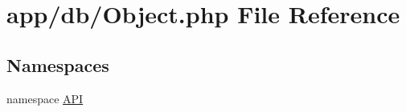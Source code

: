 \hypertarget{Object_8php}{
\section{app/db/Object.php File Reference}
\label{d7/da1/Object_8php}
}
\subsection*{Namespaces}
\begin{DoxyCompactItemize}
\item 
namespace \hyperlink{namespaceAPI}{API}
\end{DoxyCompactItemize}
